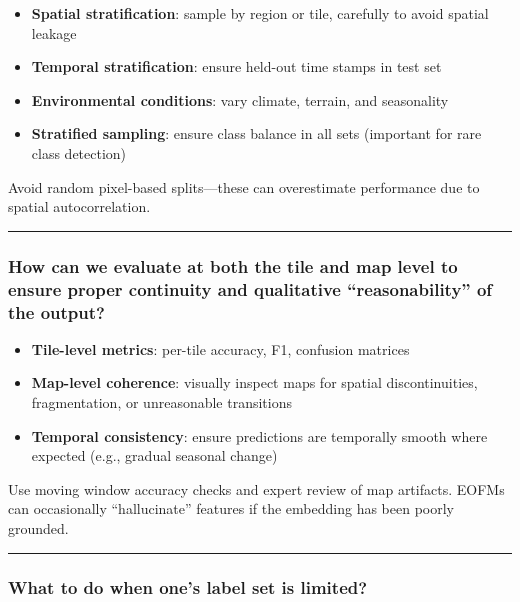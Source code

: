 \documentclass[
  letterpaper,
  DIV=11,
  numbers=noendperiod]{scrreprt}
\providecommand{\tightlist}{%
  \setlength{\itemsep}{0pt}\setlength{\parskip}{0pt}}\usepackage{longtable,booktabs,array}
\begin{document}
\begin{itemize}
\tightlist
\item
  \textbf{Spatial stratification}: sample by region or tile, carefully
  to avoid spatial leakage
\item
  \textbf{Temporal stratification}: ensure held-out time stamps in test
  set
\item
  \textbf{Environmental conditions}: vary climate, terrain, and
  seasonality
\item
  \textbf{Stratified sampling}: ensure class balance in all sets
  (important for rare class detection)
\end{itemize}

Avoid random pixel-based splits---these can overestimate performance due
to spatial autocorrelation.

\begin{center}\rule{0.5\linewidth}{0.5pt}\end{center}

\subsubsection{How can we evaluate at both the tile and map level to
ensure proper continuity and qualitative ``reasonability'' of the
output?}\label{how-can-we-evaluate-at-both-the-tile-and-map-level-to-ensure-proper-continuity-and-qualitative-reasonability-of-the-output}

\begin{itemize}
\tightlist
\item
  \textbf{Tile-level metrics}: per-tile accuracy, F1, confusion matrices
\item
  \textbf{Map-level coherence}: visually inspect maps for spatial
  discontinuities, fragmentation, or unreasonable transitions
\item
  \textbf{Temporal consistency}: ensure predictions are temporally
  smooth where expected (e.g., gradual seasonal change)
\end{itemize}

Use moving window accuracy checks and expert review of map artifacts.
EOFMs can occasionally ``hallucinate'' features if the embedding has
been poorly grounded.

\begin{center}\rule{0.5\linewidth}{0.5pt}\end{center}

\subsubsection{What to do when one's label set is
limited?}\label{what-to-do-when-ones-label-set-is-limited}
\end{document}
